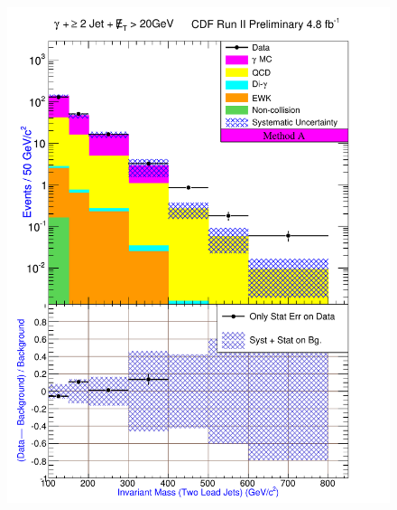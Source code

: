 \begin{figure}[h!]
{\includegraphics[keepaspectratio=true, scale=\resultsHistScale]{G30JetsMet20_MtdA_plot2_InvMass_j1j2.pdf}}

\end{figure}
